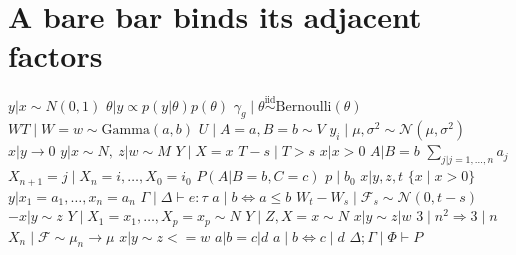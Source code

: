 \documentclass{article}
\begin{document}
\section{A bare bar binds its adjacent factors}
$y|x\sim N(0,1)$ $\theta|y\propto p(y|\theta)p(\theta)$ $\gamma_g\mid\theta\stackrel{\mathrm{iid}}{\sim}\mathrm{Bernoulli}(\theta)$
$WT\mid W=w\sim\mathrm{Gamma}(a,b)$ $U\mid A=a,B=b\sim V$ $y_i\mid\mu,\sigma^2\sim\mathcal N(\mu,\sigma^2)$ $x|y\to 0$
$y|x\sim N,\ z|w\sim M$ $Y\mid X=x$ $T-s\mid T>s$ $x|x>0$ $A|B=b$ $\sum_{j|j=1,\ldots,n}a_j$
$X_{n+1}=j\mid X_n=i,\ldots,X_0=i_0$ $P(A|B=b,C=c)$ $p\mid b_0$ $x|y,z,t$ $\{x\mid x>0\}$ $y|x_1=a_1,\ldots,x_n=a_n$
$\Gamma\mid\Delta\vdash e:\tau$ $a\mid b\iff a\leq b$ $W_t-W_s\mid\mathcal F_s\sim\mathcal N(0,t-s)$ $-x|y\sim z$
$Y\mid X_1=x_1,\ldots,X_p=x_p\sim N$ $Y\mid Z,X=x\sim N$ $x|y\sim z|w$ $3\mid n^2\Rightarrow 3\mid n$
$X_n\mid\mathcal F\sim\mu_n\to\mu$ $x|y\sim z<=w$ $a|b=c|d$ $a\mid b\iff c\mid d$ $\Delta;\Gamma\mid\Phi\vdash P$

\end{document}

